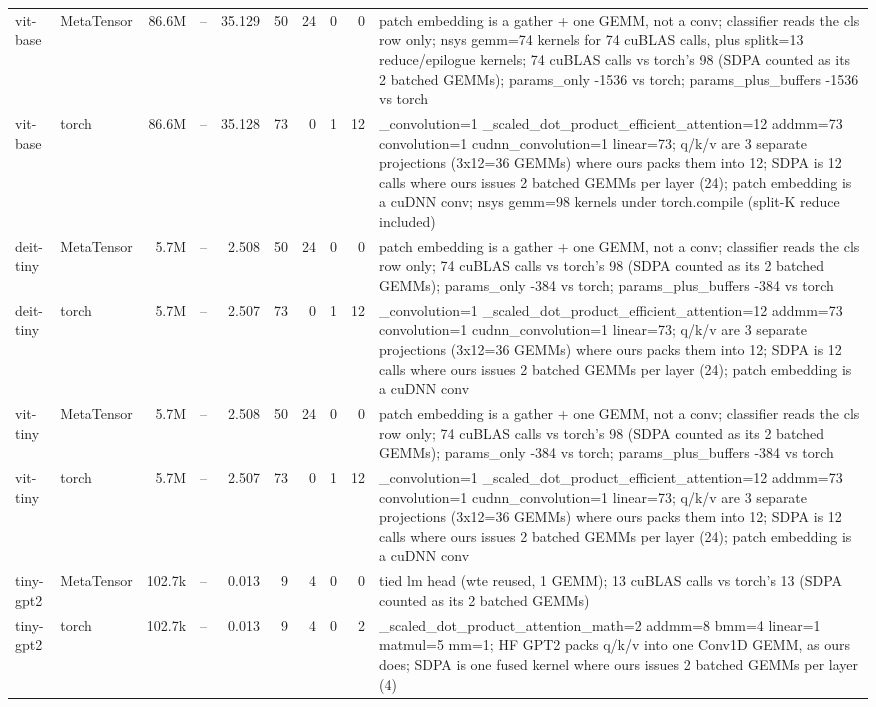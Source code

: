 \begin{tabular}{llrrrrrrrp{}}
vit-base & MetaTensor & 86.6M & -- & 35.129 & 50 & 24 & 0 & 0 & patch embedding is a gather + one GEMM, not a conv; classifier reads the cls row only; nsys gemm=74 kernels for 74 cuBLAS calls, plus splitk=13 reduce/epilogue kernels; 74 cuBLAS calls vs torch's 98 (SDPA counted as its 2 batched GEMMs); params\_only -1536 vs torch; params\_plus\_buffers -1536 vs torch \\
vit-base & torch & 86.6M & -- & 35.128 & 73 & 0 & 1 & 12 & \_convolution=1 \_scaled\_dot\_product\_efficient\_attention=12 addmm=73 convolution=1 cudnn\_convolution=1 linear=73; q/k/v are 3 separate projections (3x12=36 GEMMs) where ours packs them into 12; SDPA is 12 calls where ours issues 2 batched GEMMs per layer (24); patch embedding is a cuDNN conv; nsys gemm=98 kernels under torch.compile (split-K reduce included) \\
deit-tiny & MetaTensor & 5.7M & -- & 2.508 & 50 & 24 & 0 & 0 & patch embedding is a gather + one GEMM, not a conv; classifier reads the cls row only; 74 cuBLAS calls vs torch's 98 (SDPA counted as its 2 batched GEMMs); params\_only -384 vs torch; params\_plus\_buffers -384 vs torch \\
deit-tiny & torch & 5.7M & -- & 2.507 & 73 & 0 & 1 & 12 & \_convolution=1 \_scaled\_dot\_product\_efficient\_attention=12 addmm=73 convolution=1 cudnn\_convolution=1 linear=73; q/k/v are 3 separate projections (3x12=36 GEMMs) where ours packs them into 12; SDPA is 12 calls where ours issues 2 batched GEMMs per layer (24); patch embedding is a cuDNN conv \\
vit-tiny & MetaTensor & 5.7M & -- & 2.508 & 50 & 24 & 0 & 0 & patch embedding is a gather + one GEMM, not a conv; classifier reads the cls row only; 74 cuBLAS calls vs torch's 98 (SDPA counted as its 2 batched GEMMs); params\_only -384 vs torch; params\_plus\_buffers -384 vs torch \\
vit-tiny & torch & 5.7M & -- & 2.507 & 73 & 0 & 1 & 12 & \_convolution=1 \_scaled\_dot\_product\_efficient\_attention=12 addmm=73 convolution=1 cudnn\_convolution=1 linear=73; q/k/v are 3 separate projections (3x12=36 GEMMs) where ours packs them into 12; SDPA is 12 calls where ours issues 2 batched GEMMs per layer (24); patch embedding is a cuDNN conv \\
tiny-gpt2 & MetaTensor & 102.7k & -- & 0.013 & 9 & 4 & 0 & 0 & tied lm head (wte reused, 1 GEMM); 13 cuBLAS calls vs torch's 13 (SDPA counted as its 2 batched GEMMs) \\
tiny-gpt2 & torch & 102.7k & -- & 0.013 & 9 & 4 & 0 & 2 & \_scaled\_dot\_product\_attention\_math=2 addmm=8 bmm=4 linear=1 matmul=5 mm=1; HF GPT2 packs q/k/v into one Conv1D GEMM, as ours does; SDPA is one fused kernel where ours issues 2 batched GEMMs per layer (4) \\

\end{tabular}
